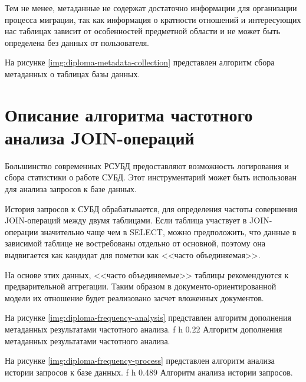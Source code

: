 Тем не менее, метаданные не содержат достаточно информации для организации процесса миграции, 
так как информация о кратности отношений и интересующих нас таблицах зависит от особенностей предметной области
и не может быть определена без данных от пользователя.

На рисунке \ref{img:diploma-metadata-collection} представлен алгоритм сбора метаданных о таблицах базы данных.

 

\clearpage


\section{Описание алгоритма частотного анализа JOIN-операций}
Большинство современных РСУБД предоставляют возможность логирования и сбора статистики о работе СУБД.
Этот инструментарий может быть использован для анализа запросов к базе данных.

История запросов к СУБД обрабатывается, 
для определения частоты совершения JOIN-операций между двумя таблицами.
Если таблица участвует в JOIN-операции значительно чаще чем в SELECT,
можно предположить, что данные в зависимой таблице не востребованы отдельно от основной, 
поэтому она выдвигается как кандидат для пометки как <<часто объединяемая>>.

На основе этих данных, <<часто объединяемые>> таблицы рекомендуются к предварительной аггрегации.
Таким образом в документо-ориентированной модели их отношение будет реализовано засчет вложенных документов.

\clearpage

На рисунке \ref{img:diploma-frequency-analysis} представлен алгоритм дополнения метаданных результатами частотного анализа.
    {f}
    {h}
    {0.22\textwidth}
{Алгоритм дополнения метаданных результатами частотного анализа.}

\clearpage
На рисунке \ref{img:diploma-frequency-process} представлен алгоритм анализа истории запросов к базе данных.
    {f}
    {h}
    {0.489\textwidth}
{Алгоритм анализа истории запросов.}

\clearpage

